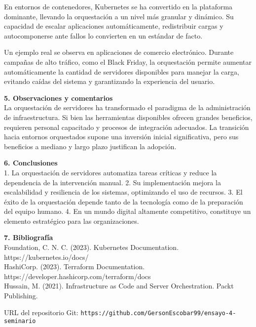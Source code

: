 \documentclass[12pt]{article}
\begin{document}
En entornos de contenedores, Kubernetes se ha convertido en la plataforma dominante, llevando la orquestación a un nivel más granular y dinámico. Su capacidad de escalar aplicaciones automáticamente, redistribuir cargas y autocomponerse ante fallos lo convierten en un estándar de facto.  

Un ejemplo real se observa en aplicaciones de comercio electrónico. Durante campañas de alto tráfico, como el Black Friday, la orquestación permite aumentar automáticamente la cantidad de servidores disponibles para manejar la carga, evitando caídas del sistema y garantizando la experiencia del usuario.

\textbf{5. Observaciones y comentarios}  
\\
La orquestación de servidores ha transformado el paradigma de la administración de infraestructura. Si bien las herramientas disponibles ofrecen grandes beneficios, requieren personal capacitado y procesos de integración adecuados. La transición hacia entornos orquestados supone una inversión inicial significativa, pero sus beneficios a mediano y largo plazo justifican la adopción.

\textbf{6. Conclusiones}  
\\
1. La orquestación de servidores automatiza tareas críticas y reduce la dependencia de la intervención manual.  
2. Su implementación mejora la escalabilidad y resiliencia de los sistemas, optimizando el uso de recursos.  
3. El éxito de la orquestación depende tanto de la tecnología como de la preparación del equipo humano.  
4. En un mundo digital altamente competitivo, constituye un elemento estratégico para las organizaciones.  

\textbf{7. Bibliografía}  
\\
Foundation, C. N. C. (2023). Kubernetes Documentation. https://kubernetes.io/docs/
\\
HashiCorp. (2023). Terraform Documentation. https://developer.hashicorp.com/terraform/docs
\\
Hussain, M. (2021). Infrastructure as Code and Server Orchestration. Packt Publishing.

\vspace{0.5cm}
\noindent URL del repositorio Git: \texttt{https://github.com/GersonEscobar99/ensayo-4-seminario}
\end{document}
